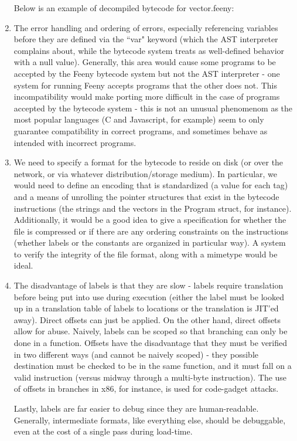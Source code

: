 \documentclass[notitlepage]{report}
\begin{document}
\begin{enumerate}
		Below is an example of decompiled bytecode for vector.feeny:
		
	\item %
		The error handling and ordering of errors, especially referencing variables before they are defined via the ``var" keyword (which the AST interpreter complains about, while the bytecode system treats as well-defined behavior with a null value).  Generally, this area would cause some programs to be accepted by the Feeny bytecode system but not the AST interpreter - one system for running Feeny accepts programs that the other does not.  This incompatibility would make porting more difficult in the case of programs accepted by the bytecode system - this is not an unusual phenomenom as the most popular languages (C and Javascript, for example) seem to only guarantee compatibility in correct programs, and sometimes behave as intended with incorrect programs.
	\item We need to specify a format for the bytecode to reside on disk (or over the network, or via whatever distribution/storage medium).  In particular, we would need to define an encoding that is standardized (a value for each tag) and a means of unrolling the pointer structures that exist in the bytecode instructions (the strings and the vectors in the Program struct, for instance).  Additionally, it would be a good idea to give a specification for whether the file is compressed or if there are any ordering constraints on the instructions (whether labels or the constants are organized in particular way).  A system to verify the integrity of the file format, along with a mimetype would be ideal.
	\item The disadvantage of labels is that they are slow - labels require translation before being put into use during execution (either the label must be looked up in a translation table of labels to locations or the translation is JIT'ed away).  Direct offsets can just be applied.  On the other hand, direct offsets allow for abuse.  Naively, labels can be scoped so that branching can only be done in a function.  Offsets have the disadvantage that they must be verified in two different ways (and cannot be naively scoped) - they possible destination must be checked to be in the same function, and it must fall on a valid instruction (versus midway through a multi-byte instruction).  The use of offsets in branches in x86, for instance, is used for code-gadget attacks.

		Lastly, labels are far easier to debug since they are human-readable.  Generally, intermediate formats, like everything else, should be debuggable, even at the cost of a single pass during load-time.
\end{enumerate}
\end{document}
